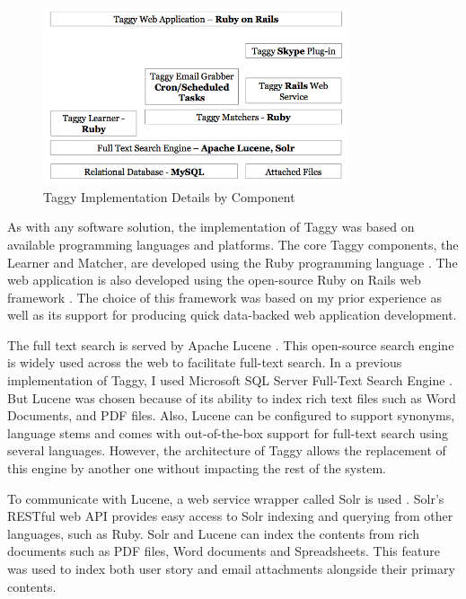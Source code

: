 \begin{figure}[!h]
	\centering
	\includegraphics[width=0.8\textwidth]{Implementation.png}
    \caption{Taggy Implementation Details by Component}
	\label{fig:implementation}
\end{figure}


As with any software solution, the implementation of Taggy was based on available programming languages and platforms. The core Taggy components, the Learner and Matcher, are developed using the Ruby programming language \cite{ruby}. The web application is also developed using the open-source Ruby on Rails web framework \cite{ruby_on_rails}. The choice of this framework was based on my prior experience as well as its support for producing quick data-backed web application development.

The full text search is served by Apache Lucene \cite{lucene}. This open-source search engine is widely used across the web to facilitate full-text search. In a previous implementation of Taggy, I used Microsoft SQL Server Full-Text Search Engine \cite{auto_tagging, sql_server}. But Lucene was chosen because of its ability to index rich text files such as Word Documents, and PDF files. Also, Lucene can be configured to support synonyms, language stems and comes with out-of-the-box support for full-text search using several languages. However, the architecture of Taggy allows the replacement of this engine by another one without impacting the rest of the system.

To communicate with Lucene, a web service wrapper called Solr is used \cite{solr}. Solr's RESTful web API provides easy access to Solr indexing and querying from other languages, such as Ruby. Solr and Lucene can index the contents from rich documents such as PDF files, Word documents and Spreadsheets. This feature was used to index both user story and email attachments alongside their primary contents.

